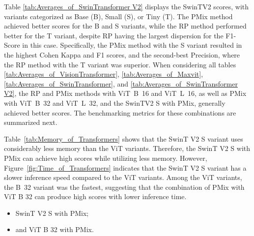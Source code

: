 Table \ref{tab:Averages_of_SwinTransformer V2} displays the \gls{SwinTV2} scores, with variants categorized as Base (B), Small (S), or Tiny (T). The \gls{PMix} method achieved better scores for the B and S variants, while the \gls{RP} method performed better for the T variant, despite \gls{RP} having the largest dispersion for the F1-Score in this case. Specifically, the \gls{PMix} method with the S variant resulted in the highest Cohen Kappa and F1 scores, and the second-best Precision, where the \gls{RP} method with the T variant was superior.
When considering all tables \ref{tab:Averages_of_VisionTransformer}, \ref{tab:Averages_of_Maxvit}, \ref{tab:Averages_of_SwinTransformer}, and \ref{tab:Averages_of_SwinTransformer V2}, the \gls{RP} and \gls{PMix} methods with \mbox{\gls{ViT} B 16} and \mbox{\gls{ViT} L 16}, as well as \gls{PMix} with \mbox{\gls{ViT} B 32} and \mbox{\gls{ViT} L 32}, and the \gls{SwinTV2} S with \gls{PMix}, generally achieved better scores. The benchmarking metrics for these combinations are summarized next.

Table~\ref{tab:Memory_of_Transformers} shows that the \gls{SwinT} V2 S variant uses considerably less memory than the \gls{ViT} variants. Therefore, the \gls{SwinT} V2 S with \gls{PMix} can achieve high scores while utilizing less memory. However, Figure~\ref{fig:Time_of_Transformers} indicates that the \gls{SwinT} V2 S variant has a slower inference speed compared to the \gls{ViT} variants. Among the \gls{ViT} variants, the \mbox{B 32} variant was the fastest, suggesting that the combination of \gls{PMix} with \gls{ViT} B 32 can produce high scores with lower inference time.  
\begin{itemize}
	\item \gls{SwinT} V2 S with \gls{PMix};
	\item and \gls{ViT} B 32 with \gls{PMix}. 
\end{itemize}

